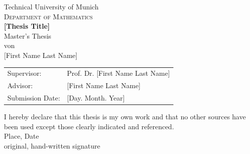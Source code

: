 \documentclass[english,a4paper,12pt,oneside]{scrbook}
\theoremstyle{break}
\theoremstyle{remark}
\begin{document}
\pagestyle{empty}       %
  \parbox{1.5cm}{}\hspace{310pt}%
  \parbox{1.5cm}{}%
\vspace*{1.5cm}
\begin{center}
{\Huge Technical University of Munich}
\\
\vspace*{1.5cm}
{\huge \textsc{Department of Mathematics}}
\\
\vspace*{3cm}
{\Huge \textbf{[Thesis Title]}}
\\
\vspace*{3cm}
{\Large Master's Thesis}\linebreak \\
{\Large von}\linebreak \\
{\Large [First Name Last Name]}\\
\vspace*{3cm}
{\Large 
\begin{tabular}{ll}
Supervisor: & Prof. Dr. [First Name Last Name]\\
Advisor: & [First Name Last Name]\\
Submission Date: & [Day. Month. Year]
\end{tabular}
}
\end{center}
\newpage    %

\vspace*{18cm}
\noindent
I hereby declare that this thesis is my own work and that no other sources have been used except those clearly indicated and referenced.
\\[2cm]
Place, Date\\
original, hand-written signature
\newpage
\end{document}
